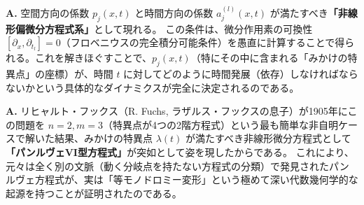 \begin{Q}
\textbf{A.} 空間方向の係数 $p_j(x,t)$ と時間方向の係数 $a_j^{(l)}(x,t)$ が満たすべき\textbf{「非線形偏微分方程式系」}として現れる。
この条件は、微分作用素の可換性 $[\partial_x, \partial_{t_l}] = 0$（フロベニウスの完全積分可能条件）を愚直に計算することで得られる。これを解きほぐすことで、$p_j(x,t)$（特にその中に含まれる「みかけの特異点」の座標）が、時間 $t$ に対してどのように時間発展（依存）しなければならないかという具体的なダイナミクスが完全に決定されるのである。
\end{Q}

\begin{Q}
\textbf{A.} リヒャルト・フックス（R. Fuchs, ラザルス・フックスの息子）が1905年にこの問題を $n=2, m=3$（特異点が4つの2階方程式）という最も簡単な非自明ケースで解いた結果、みかけの特異点 $\lambda(t)$ が満たすべき非線形微分方程式として\textbf{「パンルヴェVI型方程式」}が突如として姿を現したからである。
これにより、元々は全く別の文脈（動く分岐点を持たない方程式の分類）で発見されたパンルヴェ方程式が、実は「等モノドロミー変形」という極めて深い代数幾何学的な起源を持つことが証明されたのである。
\end{Q}

